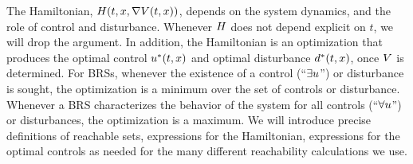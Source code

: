 The Hamiltonian, $H(t, x, \nabla V(t,x))$, depends on the system dynamics, and the role of control and disturbance. Whenever $H$ does not depend explicit on $t$, we will drop the argument. In addition, the Hamiltonian is an optimization that produces the optimal control $u^*(t, x)$ and optimal disturbance $d^*(t, x)$, once $V$ is determined. For BRSs, whenever the existence of a control (``$\exists u$'') or disturbance is sought, the optimization is a minimum over the set of controls or disturbance. Whenever a BRS characterizes the behavior of the system for all controls (``$\forall u$'') or disturbances, the optimization is a maximum. We will introduce precise definitions of reachable sets, expressions for the Hamiltonian, expressions for the optimal controls as needed for the many different reachability calculations we use. %
%
%
%
%
%
%
